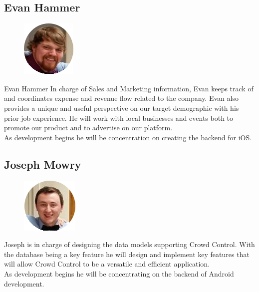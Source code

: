 \subsection{Evan Hammer}
\begin{figure}
\includegraphics{evanhammer}
\end{figure}
Evan Hammer In charge of Sales and Marketing information, Evan keeps track of and coordinates expense and revenue flow related to the company. Evan also provides a unique and useful perspective on our target demographic with his prior job experience. He will work with local businesses and events both to promote our product and to advertise on our platform.\\
 As development begins he will be concentration on creating the backend for iOS. \\
\newline
\newline
\newline
 
\noindent
\subsection{Joseph Mowry}
\begin{figure}
\includegraphics{joemowry}
\end{figure}
Joseph is in charge of designing the data models supporting Crowd Control. With the database being a key feature he will design and implement key features that will allow Crowd Control to be a versatile and efficient application.\\
 As development begins he will be concentrating on the backend of Android development.\\

